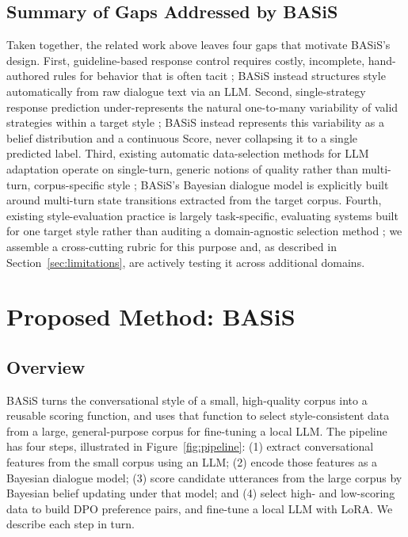 \documentclass[manuscript,review,anonymous]{acmart}
\begin{document}
\subsection{Summary of Gaps Addressed by BASiS}
Taken together, the related work above leaves four gaps that motivate BASiS's design. First, guideline-based response control requires costly, incomplete, hand-authored rules for behavior that is often tacit \cite{wen2025guidedtod}; BASiS instead structures style automatically from raw dialogue text via an LLM. Second, single-strategy response prediction under-represents the natural one-to-many variability of valid strategies within a target style \cite{wan2025emodynamix}; BASiS instead represents this variability as a belief distribution and a continuous Score, never collapsing it to a single predicted label. Third, existing automatic data-selection methods for LLM adaptation operate on single-turn, generic notions of quality rather than multi-turn, corpus-specific style \cite{chen2023alpagasus,zhang2025datasurvey}; BASiS's Bayesian dialogue model is explicitly built around multi-turn state transitions extracted from the target corpus. Fourth, existing style-evaluation practice is largely task-specific, evaluating systems built for one target style rather than auditing a domain-agnostic selection method \cite{mir2019styletransfer,liu2021esconv,zhang2018persona,deng2023mixedinitiative}; we assemble a cross-cutting rubric for this purpose and, as described in Section~\ref{sec:limitations}, are actively testing it across additional domains.


\section{Proposed Method: BASiS}
\label{sec:method}

\subsection{Overview}
BASiS turns the conversational style of a small, high-quality corpus into a reusable scoring function, and uses that function to select style-consistent data from a large, general-purpose corpus for fine-tuning a local LLM. The pipeline has four steps, illustrated in Figure~\ref{fig:pipeline}: (1) extract conversational features from the small corpus using an LLM; (2) encode those features as a Bayesian dialogue model; (3) score candidate utterances from the large corpus by Bayesian belief updating under that model; and (4) select high- and low-scoring data to build DPO preference pairs, and fine-tune a local LLM with LoRA. We describe each step in turn.
\end{document}
